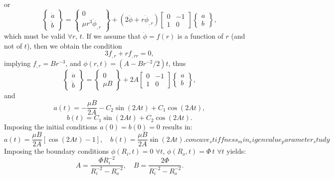 or
\begin{equation}
  \left\{ \begin{array}{c} \dot{a} \\ \dot{b} \end{array} \right\} = \left\{ \begin{array}{c} 0 \\ \mu r^3 \dot{\phi}_{,r} \end{array} \right\} + (2 \dot{\phi} + r \dot{\phi}_{,r}) \left[ \begin{array}{cc} 0 & -1 \\ 1 & 0 \end{array} \right] \left\{ \begin{array}{c} a \\ b \end{array} \right\},
\end{equation}
which must be valid $\forall r, \, t$. If we assume that $\dot{\phi} = f(r)$ is a function of $r$ (and not of $t$), then we obtain the condition
\begin{equation}
  3 f_{,r} + r f_{,rr} = 0,
\end{equation}
implying $f_{,r} = B r^{-3}$, and $\phi (r, t) = (A - B r^{-2} / 2)t$, thus
\begin{equation}
  \left\{ \begin{array}{c} \dot{a} \\ \dot{b} \end{array} \right\} = \left\{ \begin{array}{c} 0 \\ \mu B \end{array} \right\} + 2 A \left[ \begin{array}{cc} 0 & -1 \\ 1 & 0 \end{array} \right] \left\{ \begin{array}{c} a \\ b \end{array} \right\},
\end{equation}
and
\begin{equation}
  a(t) = - \frac{\mu B}{2 A} - C_2 \sin (2 A t) + C_1 \cos (2 A t),
\end{equation}
\begin{equation}
  b(t) = C_1 \sin (2 A t) + C_2 \cos (2 A t).
\end{equation}
Imposing the initial conditions $a(0) = b(0) = 0$ results in:
\begin{equation}
  a(t) = \frac{\mu B}{2 A} \left[ \cos (2 A t) - 1 \right], \quad b(t) = \frac{\mu B}{2 A} \sin (2 A t).concave_stiffness_min_eigenvalue_parameter_study
\end{equation}
Imposing the boundary conditions $\phi(R_i,t) = 0 \, \, \forall t$, $\phi(R_o,t) = \Phi \, t \, \, \forall t$ yields:
\begin{equation}
  A = \frac{\Phi R_i^{-2}}{R_i^{-2} - R_o^{-2}}, \quad B = \frac{2 \Phi}{R_i^{-2} - R_o^{-2}}.
\end{equation}

